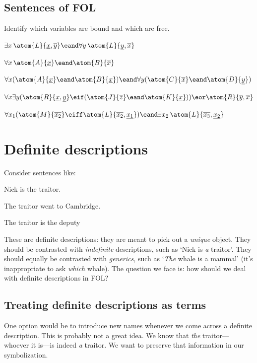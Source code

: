 \begin{practiceproblems}
\chapter{Sentences of FOL}\setcounter{ProbPart}{0}
\problempart
\label{pr:freeFOL-identity}
Identify which variables are bound and which are free.
\begin{problemslist}
\item $\exists x\, \atom{L}{\underline{x},\overline{y}} \eand \forall y\,\atom{L}{\underline{y},\overline{x}}$
\item $\forall x\, \atom{A}{\underline{x}} \eand \atom{B}{\overline{x}}$
\item $\forall x (\atom{A}{\underline{x}} \eand \atom{B}{\underline{x}}) \eand \forall y(\atom{C}{\overline{x}} \eand \atom{D}{\underline{y}})$
\item $\forall x\exists y(\atom{R}{\underline{x},\underline{y}} \eif (\atom{J}{\overline{z}} \eand \atom{K}{\underline{x}})) \eor \atom{R}{\overline{y},\overline{x}}$
\item $\forall x_1(\atom{M}{\overline{x_2}} \eiff \atom{L}{\overline{x_2},\underline{x_1}}) \eand \exists x_2\, \atom{L}{\overline{x_3},\underline{x_2}}$
\end{problemslist}


\end{practiceproblems}


\chapter{Definite descriptions}\label{subsec:defdesc}
Consider sentences like:
	\begin{samplesent}
		\item\label{sent:traitor1} Nick is the traitor.
		\item\label{sent:traitor2} The traitor went to Cambridge.
		\item\label{sent:traitor3} The traitor is the deputy
	\end{samplesent}
These are definite descriptions: they are meant to pick out a \emph{unique} object. They should be contrasted with \emph{indefinite} descriptions, such as `Nick  is \emph{a} traitor'. They should equally be contrasted with \emph{generics}, such as `\emph{The} whale is a mammal' (it's inappropriate to ask \emph{which} whale). The question we face is: how should we deal with definite descriptions in FOL?


\section{Treating definite descriptions as terms}
One option would be to introduce new names whenever we come across a definite description. This is probably not a great idea. We know that \emph{the} traitor---whoever it is---is indeed \emph{a} traitor. We want to preserve that information in our symbolization.

